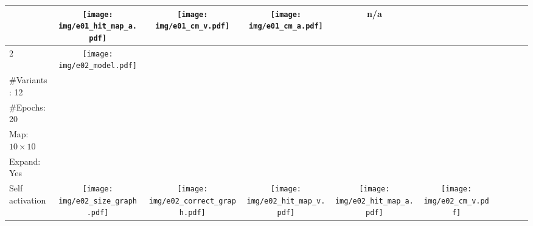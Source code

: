 \documentclass[twocolumn]{article}
\begin{document}
\begin{landscape}
\begin{table}
\begin{tabular}{lccccccccc}
\begin{minipage}{1.7cm}
            \end{minipage}
            & \begin{minipage}{1.7cm}
                \texttt{[image: img/e01\_hit\_map\_a.pdf]}
            \end{minipage}
            & \begin{minipage}{1.7cm}
                \texttt{[image: img/e01\_cm\_v.pdf]}
            \end{minipage}
            & \begin{minipage}{1.7cm}
                \texttt{[image: img/e01\_cm\_a.pdf]}
            \end{minipage}
            & n/a
            \\
        \hline
        2
            & \begin{minipage}{1.7cm}
                \texttt{[image: img/e02\_model.pdf]}
            \end{minipage}
            & \begin{minipage}{2cm}
                \scriptsize
                \#Categories: 30 \\
                \#Variants: 12 \\
                \#Epochs: 20 \\
                Map: $10 \times 10$ \\
                Expand: Yes \\
                Self activation
            \end{minipage}
            & \begin{minipage}{1.7cm}
                \texttt{[image: img/e02\_size\_graph.pdf]}
            \end{minipage}
            & \begin{minipage}{1.7cm}
                \texttt{[image: img/e02\_correct\_graph.pdf]}
            \end{minipage}
            & \begin{minipage}{1.7cm}
                \texttt{[image: img/e02\_hit\_map\_v.pdf]}
            \end{minipage}
            & \begin{minipage}{1.7cm}
                \texttt{[image: img/e02\_hit\_map\_a.pdf]}
            \end{minipage}
            & \begin{minipage}{1.7cm}
                \texttt{[image: img/e02\_cm\_v.pdf]}

\end{minipage}
\end{tabular}
\end{table}
\end{landscape}
\end{document}
